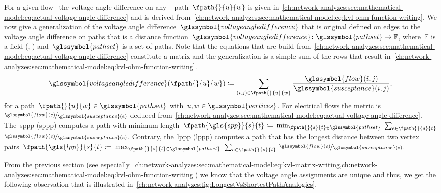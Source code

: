 For a given flow~ the voltage angle difference on
any~\vertexa-\vertexc-path~$\fpath{}{\vertexa}{\vertexc}$ is given
in~\cref{ch:network-analyzes:sec:mathematical-model:eq:actual-voltage-angle-difference}
and is derived
from~\cref{ch:network-analyzes:sec:mathematical-model:eq:kvl-ohm-function-writing}.
We now give a generalization of the voltage angle difference~$
\glssymbol{voltageangledifference}$ that is original defined on edges to the
voltage angle difference on paths that is a distance
function~$\glssymbol{voltageangledifference}\colon\glssymbol{pathset}\to\mathbb{F}$,
where~$
\mathbb{F}$ is a field (\eg, \reals) and~$\glssymbol{pathset}$ is a set of
paths. Note that the equations that are build
from~\cref{ch:network-analyzes:sec:mathematical-model:eq:actual-voltage-angle-difference}
constitute a matrix and the generalization is a simple sum of the rows that
result
in~\cref{ch:network-analyzes:sec:mathematical-model:eq:kvl-ohm-function-writing}.
%
\begin{equation}
    \glssymbol{voltageangledifference}(\fpath{}{\vertexa}{\vertexc})
    \coloneqq
    \sum_{(i,j)\in\fpath{}{\vertexa}{\vertexc}}\frac{\glssymbol{flow}(i,j)}
    {\glssymbol{susceptance}(i,j)},
    \label{ch:network-analyzes:sec:mathematical-model:eq:actual-voltage-angle-difference}
\end{equation}
% 
for a path~$\fpath{}{\vertexa}{\vertexc}\in\glssymbol{pathset}$
with~$\vertexa,\vertexc\in\glssymbol{vertices}$. 
% 
For electrical flows the metric is~$\nicefrac{\glssymbol{flow}(\edge)}{
\glssymbol{susceptance}(\edge)}$ deduced from~\cref{ch:network-analyzes:sec:mathematical-model:eq:actual-voltage-angle-difference}.
% 
The~\acrlong{sppp} (\gls{sppp}) computes a path with minimum length~$
\fpath{\gls{spp}}{\source}{\sink}\coloneqq$
$\min_{\fpath{}{\source}{\sink}\in\glssymbol{pathset}} $
$\sum_{\edge\in\fpath{}{\source}{\sink}}$
$\nicefrac{\glssymbol{flow}(\edge)}{\glssymbol{susceptance}(\edge)}
$. Contrary, the~\acrlong{lppp} (\gls{lppp}) computes a
path that has the longest distance between two vertex pairs~$
\fpath{\gls{lpp}}{\source}{\sink}\coloneqq $
$\max_{\fpath{}{\source}{\sink}\in\glssymbol{pathset}}$
$\sum_{\edge\in\fpath{}{\source}{\sink}}$
$\nicefrac{\glssymbol{flow}(\edge)}{\glssymbol{susceptance}(\edge)}$.  

From the previous section (see
especially~\cref{ch:network-analyzes:sec:mathematical-model:eq:kvl-matrix-writing,ch:network-analyzes:sec:mathematical-model:eq:kvl-ohm-function-writing})
we know that the voltage angle assignments are unique and thus, we get the
following observation that is illustrated
in~\cref{ch:network-analyzes:fig:LongestVsShortestPathAnalogies}.

